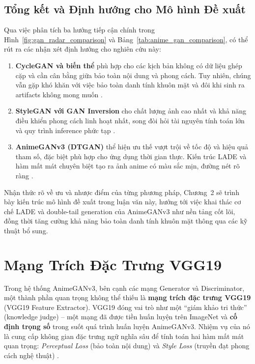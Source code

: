 \subsection{Tổng kết và Định hướng cho Mô hình Đề xuất}

Qua việc phân tích ba hướng tiếp cận chính trong Hình~\ref{fig:gan_radar_comparison} và Bảng~\ref{tab:anime_gan_comparison}, có thể rút ra các nhận xét định hướng cho nghiên cứu này:

\begin{enumerate}
    \item \textbf{CycleGAN và biến thể} phù hợp cho các kịch bản không có dữ liệu ghép cặp và cần cân bằng giữa bảo toàn nội dung và phong cách. Tuy nhiên, chúng vẫn gặp khó khăn với việc bảo toàn danh tính khuôn mặt và đôi khi sinh ra artifacts không mong muốn \cite{Zhu2017, Kim2020}.
    \item \textbf{StyleGAN với GAN Inversion} cho chất lượng ảnh cao nhất và khả năng điều khiển phong cách linh hoạt nhất, song đòi hỏi tài nguyên tính toán lớn và quy trình inference phức tạp \cite{Karras2019, Richardson2021}.
    \item \textbf{AnimeGANv3 (DTGAN)} thể hiện ưu thế vượt trội về tốc độ và hiệu quả tham số, đặc biệt phù hợp cho ứng dụng thời gian thực. Kiến trúc LADE và hàm mất mát chuyên biệt tạo ra ảnh anime có màu sắc mịn, đường nét rõ ràng \cite{Liu2024}.
\end{enumerate}

Nhận thức rõ về ưu và nhược điểm của từng phương pháp, Chương~2 sẽ trình bày kiến trúc mô hình đề xuất trong luận văn này, hướng tới việc khai thác cơ chế LADE và double-tail generation của AnimeGANv3 như nền tảng cốt lõi, đồng thời tăng cường khả năng bảo toàn danh tính khuôn mặt thông qua các kỹ thuật bổ sung.


\section{Mạng Trích Đặc Trưng VGG19}
\label{sec:vgg19_feature_extractor}

Trong hệ thống AnimeGANv3, bên cạnh các mạng Generator và Discriminator, một thành phần
quan trọng không thể thiếu là \textbf{mạng trích đặc trưng VGG19} (VGG19 Feature Extractor).
VGG19 đóng vai trò như một ``giám khảo tri thức'' (knowledge judge) -- một mạng đã được tiền
huấn luyện trên ImageNet \cite{Simonyan2015} và \textbf{cố định trọng số} trong suốt quá trình
huấn luyện AnimeGANv3. Nhiệm vụ của nó là cung cấp không gian đặc trưng ngữ nghĩa sâu để tính
toán hai hàm mất mát quan trọng: \textit{Perceptual Loss} (bảo toàn nội dung) và
\textit{Style Loss} (truyền đạt phong cách nghệ thuật) \cite{Johnson2016, Gatys2016}.

